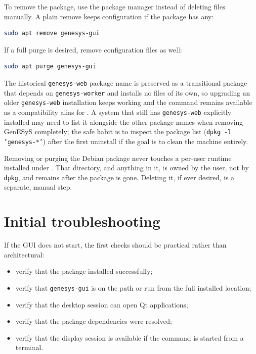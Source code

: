To remove the package, use the package manager instead of deleting files
manually. A plain remove keeps configuration if the package has any:

\begin{lstlisting}[language=bash,caption={Removing the GenESyS package},label={lst:user-installation-remove}]
sudo apt remove genesys-gui
\end{lstlisting}

If a full purge is desired, remove configuration files as well:

\begin{lstlisting}[language=bash,caption={Purging the GenESyS package},label={lst:user-installation-purge}]
sudo apt purge genesys-gui
\end{lstlisting}

The historical \texttt{genesys-web} package name is preserved as a transitional
package that depends on \texttt{genesys-worker} and installs no files of its
own, so upgrading an older \texttt{genesys-web} installation keeps working and
the  command remains available as a compatibility alias for
. A system that still has \texttt{genesys-web} explicitly
installed may need to list it alongside the other package names when removing
GenESyS completely; the safe habit is to inspect the package list
(\texttt{dpkg -l 'genesys-*'}) after the first uninstall if the goal is to
clean the machine entirely.

Removing or purging the Debian package never touches a per-user runtime
installed under . That directory, and anything
in it, is owned by the user, not by \texttt{dpkg}, and remains after the
package is gone. Deleting it, if ever desired, is a separate, manual step.

\section{Initial troubleshooting}
\label{sec:user-installation-troubleshooting}

If the GUI does not start, the first checks should be practical rather than
architectural:
\begin{itemize}
\item verify that the package installed successfully;
\item verify that \texttt{genesys-gui} is on the path or run from the full
  installed location;
\item verify that the desktop session can open Qt applications;
\item verify that the package dependencies were resolved;
\item verify that the display session is available if the command is started
from a terminal.
\end{itemize}

